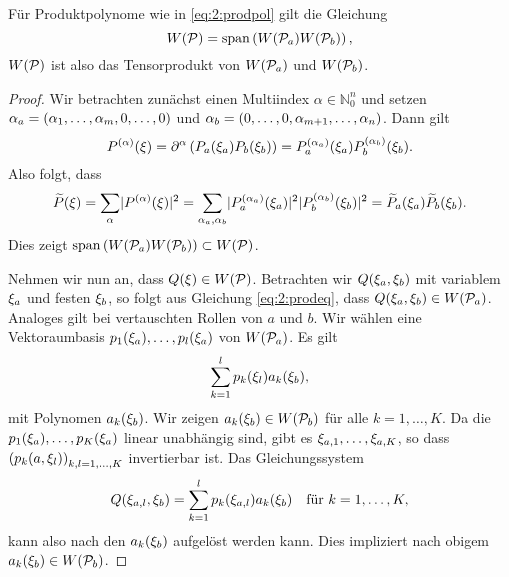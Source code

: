 \begin{thm}
Für Produktpolynome wie in \eqref{eq:2:prodpol}
gilt die Gleichung
\begin{equation}
W(\mathcal P)=\operatorname{span}\left(W(\mathcal P_a) W(\mathcal P_b)\right),
\end{equation}
$W(\mathcal P)$ ist also das Tensorprodukt von $W(\mathcal P_a)$ und $W(\mathcal P_b)$.
\end{thm}
\begin{proof}
Wir betrachten zunächst einen Multiindex $\alpha\in\mathbb N_0^n$ und setzen $\alpha_a=(\alpha_1,\dots,\alpha_m,0,\dots,0)$
und $\alpha_b=(0,\dots,0,\alpha_{m+1},\dots,\alpha_n)$. Dann gilt
\begin{equation}
P^{(\alpha)}(\xi)
=\partial^\alpha\left(P_a(\xi_a)P_b(\xi_b)\right)
=P^{(\alpha_a)}_a(\xi_a)P^{(\alpha_b)}_b(\xi_b).
\end{equation} 
Also folgt, dass
\begin{equation}\label{eq:2:prodeq}
\widetilde{P}(\xi)=\sum_\alpha\lvert P^{(\alpha)}(\xi)\rvert^2
=\sum_{\alpha_a,\alpha_b}\lvert P^{(\alpha_a)}_a(\xi_a)\rvert^2\lvert P^{(\alpha_b)}_b(\xi_b)\rvert^2
=\widetilde{P}_a(\xi_a)\widetilde{P}_b(\xi_b).
\end{equation}
Dies zeigt $\operatorname{span}\left(W(\mathcal P_a) W(\mathcal P_b)\right)\subset W(\mathcal P)$. 

Nehmen wir nun an, dass $Q(\xi)\in W(\mathcal P)$.
Betrachten wir $Q(\xi_a,\xi_{b})$ mit variablem $\xi_a$ und festen $\xi_{b}$,
so folgt aus Gleichung \eqref{eq:2:prodeq},
dass $Q(\xi_a,\xi_{b})\in W(\mathcal P_a)$.
Analoges gilt bei vertauschten Rollen von $a$ und $b$.
Wir wählen eine Vektoraumbasis $p_1(\xi_a),\dots,p_l(\xi_a)$ von $W(\mathcal P_a)$.
Es gilt
\begin{equation}
\sum_{k=1}^lp_k(\xi_l)a_k(\xi_b),
\end{equation}
mit Polynomen $a_k(\xi_b)$.
Wir zeigen $a_k(\xi_b)\in W(\mathcal P_b)$ für alle $k=1,\dots,K$.
Da die $p_1(\xi_a),\dots,p_K(\xi_a)$ linear unabhängig sind,
gibt es $\xi_{a,1},\dots,\xi_{a,K}$,
so dass $\left(p_k(a,\xi_l)\right)_{k,l=1,\dots,K}$ invertierbar ist.
Das Gleichungssystem
\begin{equation}
Q(\xi_{a,l},\xi_b)=\sum_{k=1}^lp_k(\xi_{a,l})a_k(\xi_b)\quad\text{für}~k=1,\dots,K,
\end{equation}
kann also nach den $a_k(\xi_b)$ aufgelöst werden kann.
Dies impliziert nach obigem $a_k(\xi_b)\in W(\mathcal P_b)$.

\end{proof}

